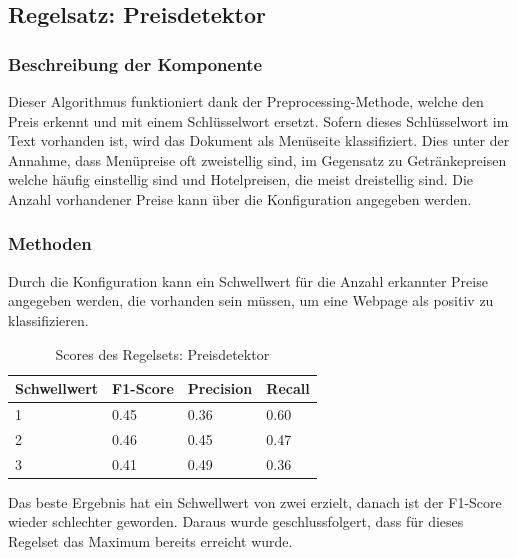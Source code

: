 \subsection{Regelsatz: Preisdetektor}
\subsubsection{Beschreibung der Komponente}
Dieser Algorithmus funktioniert dank der Preprocessing-Methode, welche den Preis erkennt und mit einem Schlüsselwort ersetzt.
Sofern dieses Schlüsselwort im Text vorhanden ist, wird das Dokument als Menüseite klassifiziert. Dies unter der Annahme, dass Menüpreise oft zweistellig sind, im Gegensatz zu Getränkepreisen welche häufig einstellig sind und Hotelpreisen, die meist dreistellig sind.
Die Anzahl vorhandener Preise kann über die Konfiguration angegeben werden.
\subsubsection{Methoden}
Durch die Konfiguration kann ein Schwellwert für die Anzahl erkannter Preise angegeben werden, die vorhanden sein müssen, um eine Webpage als positiv zu klassifizieren.\\
\begin{table}[H]
	\caption{Scores des Regelsets: Preisdetektor}
	\centering
	\begin{tabular}{|l|l|l|l|}
		\hline
		Schwellwert & F1-Score & Precision & Recall\\
		\hline
		1 & 0.45 & 0.36 & 0.60  \\
		2 & 0.46 & 0.45 & 0.47 \\
		3 & 0.41 & 0.49 & 0.36 \\
		\hline
	\end{tabular}
\end{table}
Das beste Ergebnis hat ein Schwellwert von zwei erzielt, danach ist der F1-Score wieder schlechter geworden.
Daraus wurde geschlussfolgert, dass für dieses Regelset das Maximum bereits erreicht wurde.
